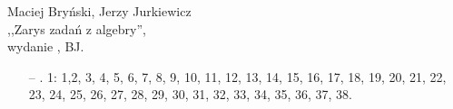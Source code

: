 \documentclass[a4paper,11pt]{article}
\newcommand{\cm}{\checkmark}
\begin{document}
\begin{center}
Maciej Bryński, Jerzy Jurkiewicz\\
,,Zarys zadań z algebry'',\\ wydanie , BJ.
\end{center}
\begin{itemize}
\item[--] . 1: 1\cm ,2\cm , 3, 4\cm, 5\cm, 6\cm, 7, 8\cm, 9\cm, 10\cm, 11, 12\cm, 13\cm, 14, 15, 16, 17, 18\cm, 19\cm, 20, 21, 22, 23, 24, 25, 26, 27, 28, 29, 30, 31, 32, 33, 34, 35, 36, 37, 38.

\end{itemize}
\end{document}

